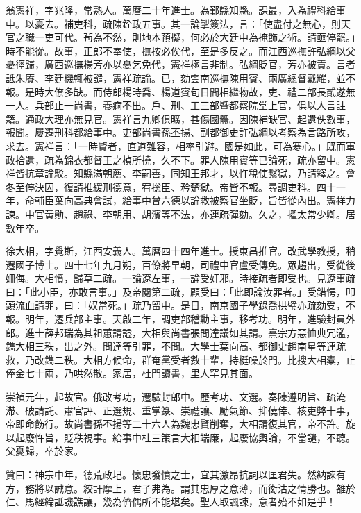 \begin{pinyinscope}
翁憲祥，字兆隆，常熟人。萬曆二十年進士。為鄞縣知縣。課最，入為禮科給事中。以憂去。補吏科，疏陳銓政五事。其一論掣簽法，言：「使盡付之無心，則天官之職一吏可代。茍為不然，則地本預擬，何必於大廷中為掩飾之術。請亟停罷。」時不能從。故事，正郎不奉使，撫按必俟代，至是多反之。而江西巡撫許弘綱以父憂徑歸，廣西巡撫楊芳亦以憂乞免代，憲祥極言非制。弘綱貶官，芳亦被責。言者詆朱賡、李廷機輒被譴，憲祥疏論。已，劾雲南巡撫陳用賓、兩廣總督戴耀，並不報。是時大僚多缺。而侍郎楊時喬、楊道賓旬日間相繼物故，吏、禮二部長貳遂無一人。兵部止一尚書，養痾不出。戶、刑、工三部暨都察院堂上官，俱以人言註籍。通政大理亦無見官。憲祥言九卿俱曠，甚傷國體。因陳補缺官、起遺佚數事，報聞。屢遷刑科都給事中。吏部尚書孫丕揚、副都御史許弘綱以考察為言路所攻，求去。憲祥言：「一時賢者，直道難容，相率引避。國是如此，可為寒心。」既而軍政拾遺，疏為錦衣都督王之楨所撓，久不下。罪人陳用賓等已論死，疏亦留中。憲祥皆抗章論駁。知縣滿朝薦、李嗣善，同知王邦才，以忤稅使繫獄，乃請釋之。會冬至停決囚，復請推緩刑德意，宥捴臣、矜楚獄。帝皆不報。尋調吏科。四十一年，命輔臣葉向高典會試，給事中曾六德以論救被察官坐貶，旨皆從內出。憲祥力諫。中官黃勛、趙祿、李朝用、胡濱等不法，亦連疏彈劾。久之，擢太常少卿。居數年卒。

徐大相，字覺斯，江西安義人。萬曆四十四年進士。授東昌推官。改武學教授，稍遷國子博士。四十七年九月朔，百僚將早朝，司禮中官盧受傳免。眾趨出，受從後姍侮。大相憤，歸草二疏。一論遼左事，一論受奸邪。時接疏者即受也。見遼事疏曰：「此小臣，亦敢言事。」及帝閱第二疏，顧受曰：「此即論汝罪者。」受錯愕，叩頭流血請罪，曰：「奴當死。」疏乃留中。是日，南京國子學錄喬拱璧亦疏劾受，不報。明年，遷兵部主事。天啟二年，調吏部稽勳主事，移考功。明年，進驗封員外郎。進士薛邦瑞為其祖蕙請謚，大相與尚書張問達議如其請。熹宗方惡恤典冗濫，鐫大相三秩，出之外。問達等引罪，不問。大學士葉向高、都御史趙南星等連疏救，乃改鐫二秩。大相方候命，群奄黨受者數十輩，持梃噪於門。比搜大相橐，止俸金七十兩，乃哄然散。家居，杜門讀書，里人罕見其面。

崇禎元年，起故官。俄改考功，遷驗封郎中。歷考功、文選。奏陳遵明旨、疏淹滯、破請託、肅官評、正選規、重掌篆、崇禮讓、勵氣節、抑僥倖、核吏弊十事，帝即命飭行。故尚書孫丕揚等二十六人為魏忠賢削奪，大相請復其官，帝不許。旋以起廢忤旨，貶秩視事。給事中杜三策言大相端廉，起廢協輿論，不當譴，不聽。父憂歸，卒於家。

贊曰：神宗中年，德荒政圮。懷忠發憤之士，宜其激昂抗詞以匡君失。然納諫有方，務將以誠意。絞訐摩上，君子弗為。謂其忠厚之意薄，而衒沽之情勝也。雒於仁、馬經綸詆譏譙讓，幾為儕偶所不能堪矣。聖人取諷諫，意者殆不如是乎！


\end{pinyinscope}